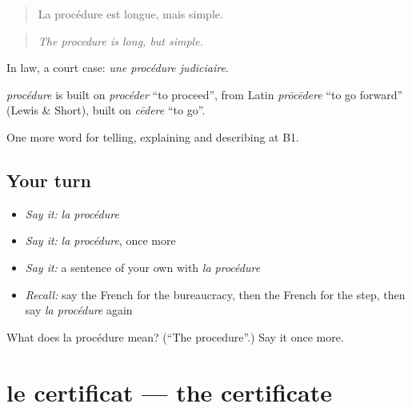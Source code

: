 \begin{quote}
La procédure est longue, mais simple.
\end{quote}

\begin{quote}
\emph{The procedure is long, but simple.}
\end{quote}

In law, a court case: \emph{une procédure judiciaire}.

\begin{cousinweb}
\emph{procédure} is built on \emph{procéder} \textquotedblleft{}to proceed\textquotedblright{}, from Latin \emph{prōcēdere} \textquotedblleft{}to go forward\textquotedblright{} (Lewis \& Short), built on \emph{cēdere} \textquotedblleft{}to go\textquotedblright{}.
\end{cousinweb}

\begin{grammarlens}[title={What you've built}]
One more word for telling, explaining and describing at B1.
\end{grammarlens}

\subsection*{Your turn}
\begin{itemize}
\raggedright
  \item \emph{Say it:} \emph{la procédure}
  \item \emph{Say it:} \emph{la procédure}, once more
  \item \emph{Say it:} a sentence of your own with \emph{la procédure}
  \item \emph{Recall:} say the French for the bureaucracy, then the French for the step, then say \emph{la procédure} again
\end{itemize}

\begin{tcolorbox}[breakable,colback=teal!4,colframe=teal!35!black,title={Before you move on}]
What does la procédure mean? (\textquotedblleft{}The procedure\textquotedblright{}.) Say it once more.
\end{tcolorbox}
\section[le certificat]{le certificat — the certificate}

\label{lesson:FR-C385-certificat}



